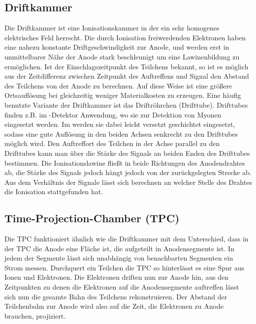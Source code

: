 \subsection{Driftkammer}\label{sec:drift}
Die Driftkammer ist eine Ionisationskammer in der ein sehr homogenes elektrisches Feld herrscht. Die durch Ionisation freiwerdenden Elektronen haben eine nahezu konstante Driftgeschwindigkeit zur Anode, und werden erst in unmittelbarer Nähe der Anode stark beschleunigt um eine Lawinenbildung zu ermöglichen. Ist der Einschlagszeitpunkt des Teilchens bekannt, so ist es möglich aus der Zeitdifferenz zwischen Zeitpunkt des Auftreffens und Signal den Abstand des Teilchens von der Anode zu berechnen. Auf diese Weise ist eine größere Ortsauflösung bei gleichzeitig weniger Materialkosten zu erzeugen.
Eine häufig benutzte Variante der Driftkammer ist das Driftröhrchen (Drifttube). Drifttubes finden z.B. im \atlas-Detektor Anwendung, wo sie zur Detektion von Myonen eingesetzt werden. Im \atlas werden sie dabei leicht versetzt geschichtet eingesetzt, sodass eine gute Auflösung in den beiden Achsen senkrecht zu den Drifttubes möglich wird. Den Auftreffort des Teilchen in der Achse parallel zu den Drifttubes kann man über die Stärke des Signals an beiden Enden des Drifttubes bestimmen. Die Ionisationslawine fließt in beide Richtungen des Anodendrahtes ab, die Stärke des Signals jedoch hängt jedoch von der zurückgelegten Strecke ab. Aus dem Verhältnis der Signale lässt sich berechnen an welcher Stelle des Drahtes die Ionisation stattgefunden hat.
\subsection{Time-Projection-Chamber (TPC)}
Die TPC funktioniert ähnlich wie die Driftkammer mit dem Unterschied, dass in der TPC die Anode eine Fläche ist, die aufgeteilt in Anodensegmente ist. In jedem der Segmente lässt sich unabhängig von benachbarten Segmenten ein Strom messen. Durchquert ein Teilchen die TPC so hinterlässt es eine Spur aus Ionen und Elektronen. Die Elektronen driften nun zur Anode hin, aus den Zeitpunkten zu denen die Elektronen auf die Anodensegmente auftreffen lässt sich nun die gesamte Bahn des Teilchens rekonstruieren. Der Abstand der Teilchenbahn zur Anode wird also auf die Zeit, die Elektronen zu Anode brauchen, projiziert.


